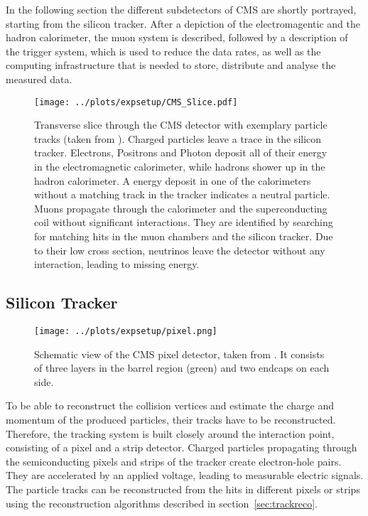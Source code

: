 \noindent In the following section the different subdetectors of CMS are shortly portrayed, starting from the silicon tracker. After a depiction of the electromagentic and the hadron calorimeter, the muon system is described, followed by a description of the trigger system, which is used to reduce the data rates, as well as the computing infrastructure that is needed to store, distribute and analyse the measured data.
\begin{figure}
	\centering
	\texttt{[image: ../plots/expsetup/CMS\_Slice.pdf]}
	\caption[Transverse slice through the CMS detector]{Transverse slice through the CMS detector with exemplary particle tracks (taken from \cite{cms_slice}). Charged particles leave a trace in the silicon tracker. Electrons, Positrons and Photon deposit all of their energy in the electromagnetic calorimeter, while hadrons shower up in the hadron calorimeter. A energy deposit in one of the calorimeters without a matching track in the tracker indicates a neutral particle. Muons propagate through the calorimeter and the superconducting coil without significant interactions. They are identified by searching for matching hits in the muon chambers and the silicon tracker. Due to their low cross section, neutrinos leave the detector without any interaction, leading to missing energy.}
	\label{fig:expsetup:cms_slice}
\end{figure}
\subsection*{Silicon Tracker}
\begin{figure}
	\centering
	\texttt{[image: ../plots/expsetup/pixel.png]}
	\caption[Schematic view of the CMS pixel detector]{Schematic view of the CMS pixel detector, taken from \cite{CMS_design}. It consists of three layers in the barrel region (green) and two endcaps on each side.}
	\label{fig:expsetup:pixel}
\end{figure}
To be able to reconstruct the collision vertices and estimate the charge and momentum of the produced particles, their tracks have to be reconstructed. Therefore, the tracking system is built closely around the interaction point, consisting of a pixel and a strip detector. Charged particles propagating through the semiconducting pixels and strips of the tracker create electron-hole pairs. They are accelerated by an applied voltage, leading to measurable electric signals. The particle tracks can be reconstructed from the hits in different pixels or strips using the reconstruction algorithms described in section~\ref{sec:trackreco}.\\

